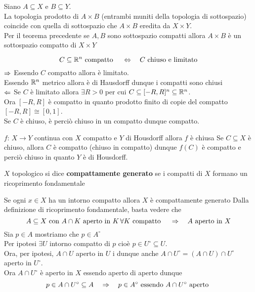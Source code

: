 \begin{oss}Siano $A\subseteq X $ e $B\subseteq Y$.\\
La topologia prodotto di $A\times B$ (entrambi muniti della topologia di sottospazio) coincide con quella di sottospazio che $A\times B$ eredita da $X\times Y$.\\
Per il teorema precedente se $A,B$ sono sottospazio compatti allora $A\times B$ \`e un sottospazio compatto di $X\times Y$
\end{oss} 
\begin{prop} $$C\subseteq \mathbb{R}^n \text{ compatto } \quad \Leftrightarrow \quad C \text{ chiuso e limitato}$$
\proof $\Rightarrow$  Essendo $C$ compatto allora \`e limitato.\\
Essendo $\mathbb{R}^n$ metrico allora \`e di Hausdorff dunque i compatti sono chiusi\\
$\Leftarrow$ Se $C$ \`e limitato allora $\exists R>0$ per cui $C\subseteq [-R,R]^n \subseteq \mathbb{R}^n$.\\
Ora $[-R,R]$ \`e compatto in quanto prodotto finito di copie del compatto $[-R,R]\cong [0,1]$.\\
Se $C$ \`e chiuso, \`e perci\`o chiuso in un compatto dunque compatto.\\
\endproof
\end{prop}
\newpage
\begin{thm}$f:\, X \to Y$ continua con $X$ compatto e $Y$ di Housdorff allora $f$ \`e chiusa
\proof Se $C\subseteq X $ \`e chiuso, allora $C$ \`e compatto (chiuso in compatto) dunque $f(C)$ \`e compatto e perci\`o chiuso in quanto $Y$ \`e di Housdorff.\\
\endproof
\end{thm}
\spazio
\begin{defn}$X$ topologico si dice \textbf{compattamente generato} se i compatti di $X$ formano un ricoprimento fondamentale
\end{defn}
\begin{lem}Se ogni $x\in X$ ha un intorno compatto allora $X$ \`e compattamente generato
\proof Dalla definizione di ricoprimento fondamentale, basta vedere che 
$$ A\subseteq X  \text{ con } A \cap K \text{ aperto in } K \, \forall K \text{ compatto } \quad \Rightarrow \quad A \text{ aperto in } X $$
Sia $p\in A$ mostriamo che $p \in A^\circ$\\
Per ipotesi $\exists U$ intorno compatto di $p$ cio\`e $p\in U^\circ \subseteq U$.\\
Ora, per ipotesi, $A\cap U$ aperto in $U$ i dunque anche $A \cap U^\circ =(A \cap U )\cap U^\circ $ aperto in $U^\circ$.\\
Ora $ A \cap U^\circ$ \`e aperto in $X$ essendo aperto di aperto dunque 
$$ p \in  A\cap U^\circ \subseteq A \quad \Rightarrow \quad  p\in A^\circ \text{ essendo } A \cap U^\circ \text{ aperto }$$
\end{lem}
